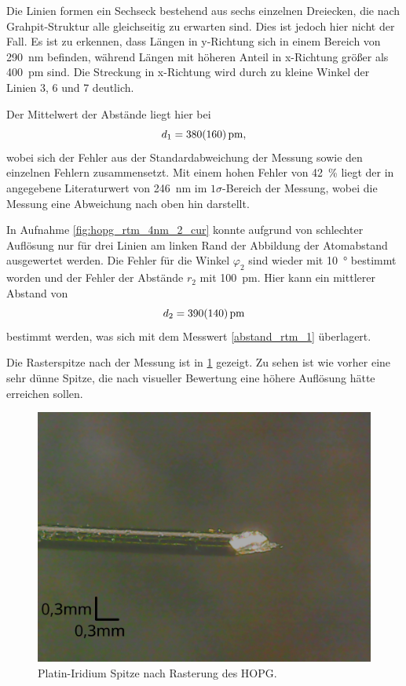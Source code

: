 Die Linien formen ein Sechseck bestehend aus sechs einzelnen Dreiecken, die nach Grahpit-Struktur alle 
gleichseitig zu erwarten sind. Dies ist jedoch hier nicht der Fall. Es ist zu erkennen, dass Längen 
in y-Richtung sich in einem Bereich von \SI{290}{\nm} befinden, während Längen mit höheren Anteil 
in x-Richtung größer als \SI{400}{\pm} sind. Die Streckung in x-Richtung wird durch zu kleine Winkel 
der Linien 3, 6 und 7 deutlich.\par 
Der Mittelwert der Abstände liegt hier bei 
\begin{equation}
	d_1 = \SI{380\pm 160}{\pm}, 
	\label{abstand_rtm_1}
\end{equation}
wobei sich der Fehler aus der Standardabweichung der Messung sowie den einzelnen Fehlern zusammensetzt. 
Mit einem hohen Fehler von \SI{42}{\percent} liegt der in \cite{skript} angegebene Literaturwert von 
\SI{246}{\nm}
im $1\sigma$-Bereich der Messung, wobei die Messung eine Abweichung nach oben hin darstellt.\\\par 

In Aufnahme \ref{fig:hopg_rtm_4nm_2_cur} konnte aufgrund von schlechter Auflösung 
nur für drei Linien am linken Rand der Abbildung der Atomabstand ausgewertet werden. Die Fehler für 
die Winkel $\varphi_2$ sind wieder mit \SI{10}{\degree} bestimmt worden und der 
Fehler der Abstände $r_2$ mit \SI{100}{\pm}. Hier kann ein mittlerer Abstand von 
\begin{equation}
	d_2 = \SI{390\pm140}{\pm}
	\label{abstand_rtm_2}
\end{equation}
bestimmt werden, was sich mit dem Messwert \ref{abstand_rtm_1} überlagert.



Die Rasterspitze nach der Messung ist in \cref{fig:spitze_hopg_nachher} gezeigt. Zu sehen ist 
wie vorher eine sehr dünne Spitze, die nach visueller Bewertung eine höhere Auflösung hätte erreichen sollen.

\begin{figure}[htb]
	\centering
	\includegraphics[width=0.5\linewidth]{figs/spitze_hopg_nachher_v2}
	\caption{Platin-Iridium Spitze nach Rasterung des HOPG.}
	\label{fig:spitze_hopg_nachher}
\end{figure}

